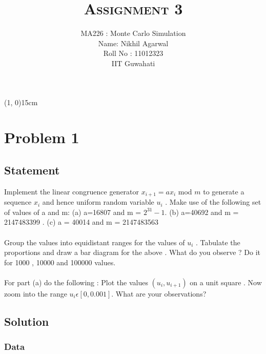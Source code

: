 \documentclass[10pt]{article}
\begin{document}
\title{\textbf{\textsc{Assignment 3}}}
\author{MA226 : Monte Carlo Simulation \\
			Name: Nikhil Agarwal \\
			Roll No : 11012323 \\
			IIT Guwahati}
\date{}
\maketitle

\begin{center}
	\line(1, 0){15cm}
\end{center}

\section{Problem 1}

\subsection{Statement}
Implement  the  linear  congruence  generator $ x_{i+1} = ax_i $  mod  $ m $ to  generate  a  sequence  $ x_i  $  and  hence  uniform random  variable $ u_i $ .  Make  use  of  the  following  set  of  values  of  a  and  m: (a) a=16807  and m = $ 2^{31}-1 $.  (b)  a=40692  and  m = 2147483399 . (c) a = 40014 and m = 2147483563  \\
\\
Group  the  values  into  equidistant  ranges  for  the  values  of $  u_i  $ . Tabulate  the  proportions  and  draw  a  bar  diagram  for the  above .  What  do you  observe  ?  Do  it  for  1000  , 10000   and   100000   values.\\
\\ 
For  part (a)  do  the  following  :  Plot  the  values  $ (u_i,u_{i+1}) $  on  a   unit  square . Now  zoom  into  the  range  $u_i  \epsilon [0,0.001]$. What  are  your  observations?
\subsection{Solution}

\subsubsection{Data}
\end{document}
